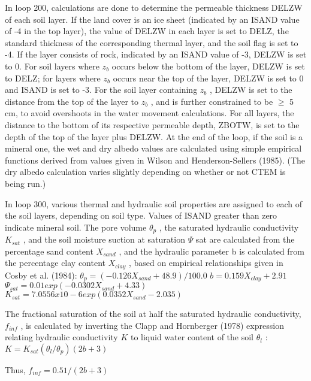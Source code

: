 In loop 200, calculations are done to determine the permeable thickness D\+E\+L\+Z\+W of each soil layer. If the land cover is an ice sheet (indicated by an I\+S\+A\+N\+D value of -\/4 in the top layer), the value of D\+E\+L\+Z\+W in each layer is set to D\+E\+L\+Z, the standard thickness of the corresponding thermal layer, and the soil flag is set to -\/4. If the layer consists of rock, indicated by an I\+S\+A\+N\+D value of -\/3, D\+E\+L\+Z\+W is set to 0. For soil layers where $z_b$ occurs below the bottom of the layer, D\+E\+L\+Z\+W is set to D\+E\+L\+Z; for layers where $z_b$ occurs near the top of the layer, D\+E\+L\+Z\+W is set to 0 and I\+S\+A\+N\+D is set to -\/3. For the soil layer containing $z_b$ , D\+E\+L\+Z\+W is set to the distance from the top of the layer to $z_b$ , and is further constrained to be $\geq$ 5 cm, to avoid overshoots in the water movement calculations. For all layers, the distance to the bottom of its respective permeable depth, Z\+B\+O\+T\+W, is set to the depth of the top of the layer plus D\+E\+L\+Z\+W. At the end of the loop, if the soil is a mineral one, the wet and dry albedo values are calculated using simple empirical functions derived from values given in Wilson and Henderson-\/\+Sellers (1985). (The dry albedo calculation varies slightly depending on whether or not C\+T\+E\+M is being run.)

In loop 300, various thermal and hydraulic soil properties are assigned to each of the soil layers, depending on soil type. Values of I\+S\+A\+N\+D greater than zero indicate mineral soil. The pore volume $\theta_p$ , the saturated hydraulic conductivity $K_{sat}$ , and the soil moisture suction at saturation $\Psi$ sat are calculated from the percentage sand content $X_{sand}$ , and the hydraulic parameter b is calculated from the percentage clay content $X_{clay}$ , based on empirical relationships given in Cosby et al. (1984)\+: $\theta_p = (-0.126 X_{sand} +48.9)/100.0$ $b = 0.159 X_{clay} + 2.91$ $\Psi_{sat} = 0.01 exp(-0.0302 X_{sand} + 4.33)$ $K_{sat} = 7.0556 x 10 -6 exp(0.0352 X_{sand} - 2.035)$

The fractional saturation of the soil at half the saturated hydraulic conductivity, $f_{inf}$ , is calculated by inverting the Clapp and Hornberger (1978) expression relating hydraulic conductivity $K$ to liquid water content of the soil $\theta_l$ \+: $K = K_{sat} (\theta_l / \theta_p ) (2b + 3)$

Thus, $f_{inf} = 0.5 1/(2b+3)$

